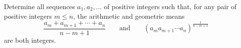 Determine all sequences $a_1, a_2, \ldots$ of positive integers such that, for any pair of positive integers $m \leq n$, the arithmetic and geometric means
\[ \frac{a_m + a_{m+1} + \cdots + a_n}{n - m + 1} \qquad \text{and} \qquad \left(a_m a_{m+1} \cdots a_n\right)^{\frac{1}{n-m+1}} \]
are both integers.
